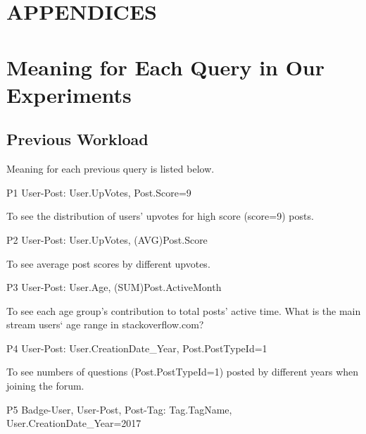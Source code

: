 \documentclass[letterpaper,12pt,titlepage,oneside,final]{book}
\begin{document}
\nocite{*}

\appendix
\chapter*{APPENDICES}
\chapter[PDF Plots From Matlab]{Meaning for Each Query in Our Experiments}
\label{AppendixA}
\section{Previous Workload}
\par
Meaning for each previous query is listed below. 

P1 \hspace{3mm} User-Post: User.UpVotes, Post.Score=9

To see the distribution of users' upvotes for high score (score=9) posts.

P2 \hspace{3mm} User-Post: User.UpVotes, (AVG)Post.Score

To see average post scores by different upvotes. 

P3 \hspace{3mm} User-Post: User.Age, (SUM)Post.ActiveMonth

To see each age group's contribution to total posts' active time. What is the main stream users` age range in stackoverflow.com?

P4 \hspace{3mm} User-Post: User.CreationDate\_Year, Post.PostTypeId=1

To see numbers of questions (Post.PostTypeId=1) posted by different years when joining the forum. 

P5 \hspace{3mm} Badge-User, User-Post, Post-Tag: Tag.TagName, User.CreationDate\_Year=2017
\end{document}
